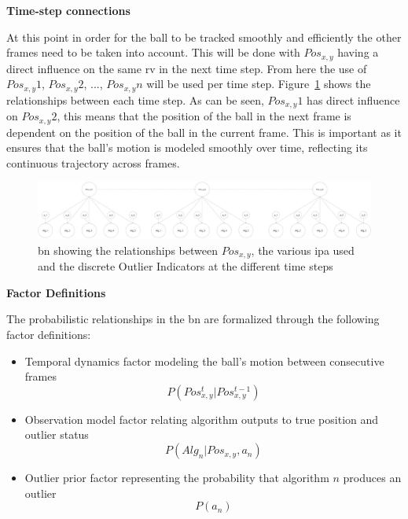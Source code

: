 \documentclass[12pt,a4paper]{article}
\begin{document}
\textbf{Time-step connections}

At this point in order for the ball to be tracked smoothly and efficiently the other frames need to be taken into account. This will be done with $Pos_{x,y}$ having a direct influence on the same \acs{rv} in the next time step. From here the use of $Pos_{x,y}1$, $Pos_{x,y}2$, ..., $Pos_{x,y}n$ will be used per time step. Figure~\ref{fig:fulltimeBN} shows the relationships between each time step. As can be seen, $Pos_{x,y}1$ has direct influence on $Pos_{x,y}2$, this means that the position of the ball in the next frame is dependent on the position of the ball in the current frame. This is important as it ensures that the ball's motion is modeled smoothly over time, reflecting its continuous trajectory across frames.
 
 \begin{figure}[H]
 	\centering
 	\includegraphics[width=1\textwidth]{BNwtime.jpg}
 	\caption{\acl{bn} showing the relationships between $Pos_{x,y}$, the various \acs{ipa} used and the discrete Outlier Indicators at the different time steps}
 	\label{fig:fulltimeBN}
 \end{figure}

 
\textbf{Factor Definitions}

The probabilistic relationships in the \acs{bn} are formalized through the following factor definitions:

\begin{itemize}
	\item Temporal dynamics factor modeling the ball's motion between consecutive frames
	\begin{equation}P(Pos_{x,y}^t | Pos_{x,y}^{t-1})\end{equation}
	\item Observation model factor relating algorithm outputs to true position and outlier status
	\begin{equation}P(Alg_n | Pos_{x,y}, a_n)\end{equation}
	\item Outlier prior factor representing the probability that algorithm $n$ produces an outlier
	\begin{equation}P(a_n)\end{equation} 
\end{itemize}
\end{document}
